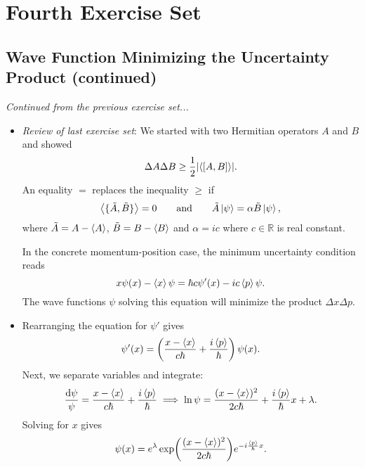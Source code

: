 \documentclass[11pt, a4paper]{article}
\newcommand{\diff}{\mathop{}\!\mathrm{d}} %
\newcommand{\eqtext}[1]{\qquad \text{#1} \qquad}
\begin{document}
\section{Fourth Exercise Set}

\subsection{Wave Function Minimizing the Uncertainty Product (continued)}
\textit{Continued from the previous exercise set...}
\begin{itemize}
	\item \textit{Review of last exercise set}: We started with two Hermitian operators $ A  $ and $ B $ and showed
	\begin{equation*}
		\Delta A \Delta B \geq \frac{1}{2}\abs{\langle [A, B] \rangle}.
	\end{equation*}
	An equality $ = $ replaces the inequality $ \geq $ if
	\begin{equation*}
		\big \langle \{\tilde{A}, \tilde{B}\}\big \rangle = 0 \eqtext{and} \tilde{A}\ket{\psi} = \alpha \tilde{B}\ket{\psi},
	\end{equation*}
	where $ \tilde{A} = A - \ev{A}$, $ \tilde{B} = B - \ev{B}$ and $ \alpha = ic $ where $ c \in \mathbb{R} $ is real constant.
	
	In the concrete momentum-position case, the minimum uncertainty condition reads
	\begin{equation*}
		x \psi(x) - \expval{x} \psi = \hbar c \psi'(x) - ic \expval{p} \psi.
	\end{equation*}
	The wave functions $ \psi $ solving this equation will minimize the product $ \Delta x \Delta p $. 
	
	\item Rearranging the equation for $ \psi' $ gives
	\begin{equation*}
		\psi'(x) = \left(\frac{x - \ev{x}}{c\hbar} + \frac{i\ev{p}}{\hbar}\right)\psi(x).
	\end{equation*}
	Next, we separate variables and integrate:
	\begin{equation*}
		\frac{\diff \psi}{\psi} = \frac{x - \ev{x}}{c \hbar} + \frac{i\ev{p}}{\hbar} \implies \ln \psi = \frac{(x - \ev{x})^{2}}{2c \hbar} + \frac{i\ev{p}}{\hbar}x + \lambda.
	\end{equation*}
	Solving for $ x $ gives
	\begin{equation*}
		\psi(x) = e^{\lambda}\exp(\frac{(x - \ev{x})^{2}}{2c\hbar})e^{-i\frac{\ev{p}}{\hbar}x}.
	\end{equation*}
	

\end{itemize}
\end{document}
